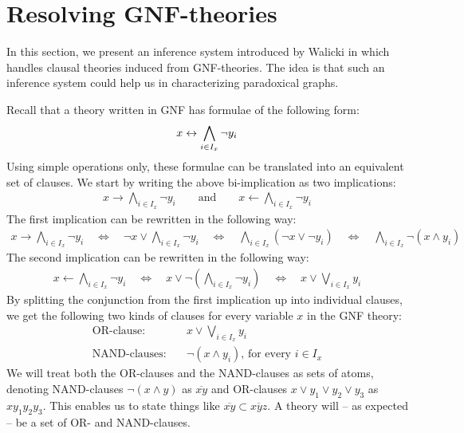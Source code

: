 

\section{Resolving GNF-theories}
\label{sec:Resolving GNF-theories}
In this section, we present an inference system introduced by Walicki in \cite{michal-completeness} which handles clausal theories induced from GNF-theories.
The idea is that such an inference system could help us in characterizing paradoxical graphs.

Recall that a theory written in GNF has formulae of the following form:
\begin{align}
  x \leftrightarrow \bigwedge_{i \in I_x} \neg y_i
\end{align}
Using simple operations only, these formulae can be translated into an equivalent set of clauses.
We start by writing the above bi-implication as two implications:
\begin{align}
  x \rightarrow \bigwedge_{i \in I_x} \neg y_i \quad\quad \text{and} \quad\quad x \leftarrow \bigwedge_{i \in I_x} \neg y_i
\end{align}
The first implication can be rewritten in the following way:
\begin{align}
  x \rightarrow \bigwedge_{i \in I_x} \neg y_i
  \quad\Leftrightarrow\quad \neg x \vee \bigwedge_{i \in I_x} \neg y_i
  \quad\Leftrightarrow\quad \bigwedge_{i \in I_x} (\neg x \vee \neg y_i)
  \quad\Leftrightarrow\quad \bigwedge_{i \in I_x} \neg (x \wedge y_i)
\end{align}
The second implication can be rewritten in the following way:
\begin{align}
  x \leftarrow \bigwedge_{i \in I_x} \neg y_i
  \quad\Leftrightarrow\quad x \vee \neg \left( \bigwedge_{i \in I_x} \neg y_i \right)
  \quad\Leftrightarrow\quad x \vee \bigvee_{i \in I_x} y_i
\end{align}
By splitting the conjunction from the first implication up into individual clauses, we get the following two kinds of clauses for every variable $x$ in the GNF theory:
\begin{align}
  \text{OR-clause:}&\quad x \vee \bigvee_{i \in I_x} y_i\\
  \text{NAND-clauses:}&\quad \neg (x \wedge y_i)\text{, for every }i \in I_x
\end{align}
We will treat both the OR-clauses and the NAND-clauses as sets of atoms, denoting NAND-clauses $\neg (x \wedge y)$ as $\overline{xy}$ and OR-clauses $x \vee y_1 \vee y_2 \vee y_3$ as $xy_1y_2y_3$.
This enables us to state things like $\overline{xy} \subset \overline{xyz}$.
A theory will -- as expected -- be a set of OR- and NAND-clauses.

